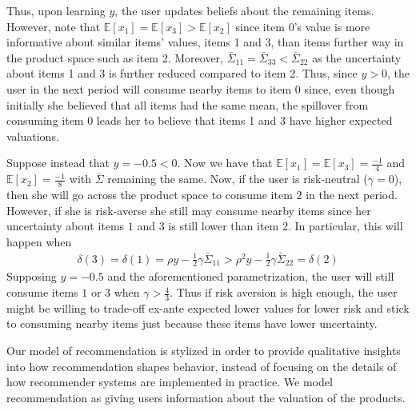 \documentclass[format=acmsmall, review=false]{acmart}
\newcommand{\xhdr}[1]{\vspace{1mm} \noindent{\bf #1}}
\begin{document}
Thus, upon learning $y$, the user updates beliefs about the remaining items. However, note that $\mathbb{E}[x_1] = \mathbb{E}[x_3] > \mathbb{E}[x_2]$ since item 0's value is more informative about similar items' values, items 1 and 3, than items further way in the product space such as item 2. Moreover, $\bar{\Sigma}_{11} = \bar{\Sigma}_{33} < \bar{\Sigma}_{22}$ as the uncertainty about items 1 and 3 is further reduced compared to item 2. Thus, since $y > 0$, the user in the next period will consume nearby items to item 0 since, even though initially she believed that all items had the same mean, the spillover from consuming item 0 leads her to believe that items 1 and 3 have higher expected valuations. 
\par 
Suppose instead that $y = -0.5 < 0$. Now we have that $\mathbb{E}[x_1] = \mathbb{E}[x_3] = \frac{-1}{4}$ and $\mathbb{E}[x_2] = \frac{-1}{8}$ with $\bar{\Sigma}$ remaining the same. Now, if the user is risk-neutral ($\gamma = 0$), then she will go across the product space to consume item $2$ in the next period. However, if she is risk-averse she still may consume nearby items since her uncertainty about items $1$ and $3$ is still lower than item $2$. In particular, this will happen when 
\begin{align*}
\delta(3) = \delta(1) = \rho y - \frac{1}{2} \gamma \bar{\Sigma}_{11} > \rho^{2} y - \frac{1}{2} \gamma \bar{\Sigma}_{22} = \delta(2)
\end{align*}
Supposing $y = -0.5$ and the aforementioned parametrization, the user will still consume items $1$ or $3$ when $\gamma > \frac{4}{3}$. Thus if risk aversion is high enough, the user might be willing to trade-off ex-ante expected lower values for lower risk and stick to consuming nearby items just because these items have lower uncertainty.
\par

\xhdr{Recommendation.}
Our model of recommendation is stylized in order to provide qualitative insights into how recommendation shapes behavior, instead of focusing on the details of how recommender systems are implemented in practice. We model recommendation as giving users information about the valuation of the products.
\par
\end{document}

